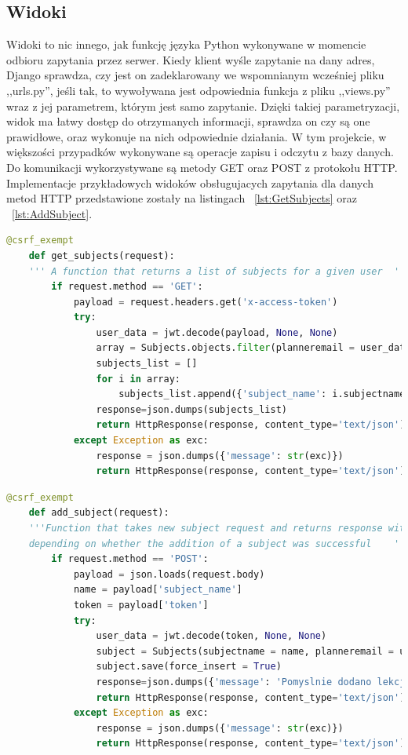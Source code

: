 \subsection{Widoki}
Widoki to nic innego, jak funkcję języka Python wykonywane w momencie odbioru zapytania przez serwer. Kiedy klient wyśle zapytanie na dany adres, Django sprawdza, czy jest on zadeklarowany we wspomnianym wcześniej pliku ,,urls.py'', jeśli tak, to wywoływana jest odpowiednia funkcja z pliku ,,views.py'' wraz z jej parametrem, którym jest samo zapytanie. Dzięki takiej parametryzacji, widok ma łatwy dostęp do otrzymanych informacji, sprawdza on czy są one prawidłowe, oraz wykonuje na nich odpowiednie działania. W tym projekcie, w większości przypadków wykonywane są operacje zapisu i odczytu z bazy danych. Do komunikacji wykorzystywane są metody GET oraz POST z protokołu HTTP.
Implementacje przykładowych widoków obsługujacych zapytania dla danych metod HTTP przedstawione zostały na listingach ~\ref{lst:GetSubjects} oraz ~\ref{lst:AddSubject}.
\begin{lstlisting}[language=Python, caption=Widok obsługujący zapytanie typu GET, label={lst:GetSubjects}]
	@csrf_exempt
	def get_subjects(request):
	''' A function that returns a list of subjects for a given user  '''
		if request.method == 'GET':
			payload = request.headers.get('x-access-token')
			try:
				user_data = jwt.decode(payload, None, None)
				array = Subjects.objects.filter(planneremail = user_data['email'])
				subjects_list = []
				for i in array:
					subjects_list.append({'subject_name': i.subjectname})
				response=json.dumps(subjects_list)
				return HttpResponse(response, content_type='text/json')
			except Exception as exc:
				response = json.dumps({'message': str(exc)})
				return HttpResponse(response, content_type='text/json')
\end{lstlisting}

\begin{lstlisting}[language=Python, caption=Widok obsługujący zapytanie typu POST, label={lst:AddSubject}]
	@csrf_exempt
	def add_subject(request):
	'''Function that takes new subject request and returns response with the appropriate message,
	depending on whether the addition of a subject was successful    '''
		if request.method == 'POST':
			payload = json.loads(request.body)
			name = payload['subject_name']
			token = payload['token']
			try:
				user_data = jwt.decode(token, None, None)
				subject = Subjects(subjectname = name, planneremail = user_data["email"])
				subject.save(force_insert = True)
				response=json.dumps({'message': 'Pomyslnie dodano lekcje'})
				return HttpResponse(response, content_type='text/json')
			except Exception as exc:
				response = json.dumps({'message': str(exc)})
				return HttpResponse(response, content_type='text/json')
\end{lstlisting}

